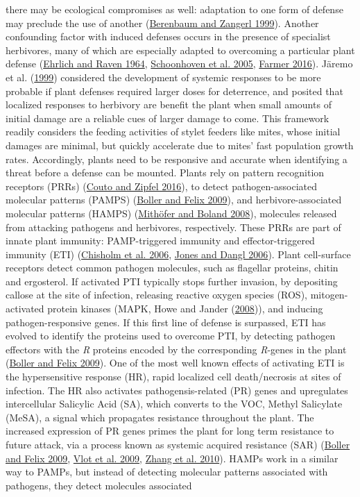 \documentclass{ufdissertation}[overrideChapters] %
\begin{document}
{there may be ecological compromises as well: adaptation to one form of defense may preclude the use of another (\protect\hyperlink{ref-Berenbaum1999}{Berenbaum and Zangerl 1999}). Another confounding factor with induced defenses occurs in the presence of specialist herbivores, many of which are especially adapted to overcoming a particular plant defense (\protect\hyperlink{ref-Ehrlich1964}{Ehrlich and Raven 1964}, \protect\hyperlink{ref-Schoonhoven2005}{Schoonhoven et al. 2005}, \protect\hyperlink{ref-Farmer2016}{Farmer 2016}). Järemo et al. (\protect\hyperlink{ref-Jaeremo1999}{1999}) considered the development of systemic responses to be more probable if plant defenses required larger doses for deterrence, and posited that localized responses to herbivory are benefit the plant when small amounts of initial damage are a reliable cues of larger damage to come. This framework readily considers the feeding activities of stylet feeders like mites, whose initial damages are minimal, but quickly accelerate due to mites' fast population growth rates. Accordingly, plants need to be responsive and accurate when identifying a threat before a defense can be mounted. Plants rely on pattern recognition receptors (PRRs) (\protect\hyperlink{ref-Couto2016}{Couto and Zipfel 2016}), to detect pathogen-associated molecular patterns (PAMPS) (\protect\hyperlink{ref-Boller2009}{Boller and Felix 2009}), and herbivore-associated molecular patterns (HAMPS) (\protect\hyperlink{ref-Mithoefer2008}{Mithöfer and Boland 2008}), molecules released from attacking pathogens and herbivores, respectively. These PRRs are part of innate plant immunity: PAMP-triggered immunity and effector-triggered immunity (ETI) (\protect\hyperlink{ref-Chisholm2006}{Chisholm et al. 2006}, \protect\hyperlink{ref-Jones2006}{Jones and Dangl 2006}). Plant cell-surface receptors detect common pathogen molecules, such as flagellar proteins, chitin and ergosterol. If activated PTI typically stops further invasion, by depositing callose at the site of infection, releasing reactive oxygen species (ROS), mitogen-activated protein kinases (MAPK, Howe and Jander (\protect\hyperlink{ref-Howe2008}{2008})), and inducing pathogen-responsive genes. If this first line of defense is surpassed, ETI has evolved to identify the proteins used to overcome PTI, by detecting pathogen effectors with the \emph{R} proteins encoded by the corresponding \emph{R}-genes in the plant (\protect\hyperlink{ref-Boller2009}{Boller and Felix 2009}). One of the most well known effects of activating ETI is the hypersensitive response (HR), rapid localized cell death/necrosis at sites of infection. The HR also activates pathogensis-related (PR) genes and upregulates intercellular Salicylic Acid (SA), which converts to the VOC, Methyl Salicylate (MeSA), a signal which propagates resistance throughout the plant. The increased expression of PR genes primes the plant for long term resistance to future attack, via a process known as systemic acquired resistance (SAR) (\protect\hyperlink{ref-Boller2009}{Boller and Felix 2009}, \protect\hyperlink{ref-Vlot2009}{Vlot et al. 2009}, \protect\hyperlink{ref-Zhang2010}{Zhang et al. 2010}). HAMPs work in a similar way to PAMPs, but instead of detecting molecular patterns associated with pathogens, they detect molecules associated }
\end{document}
